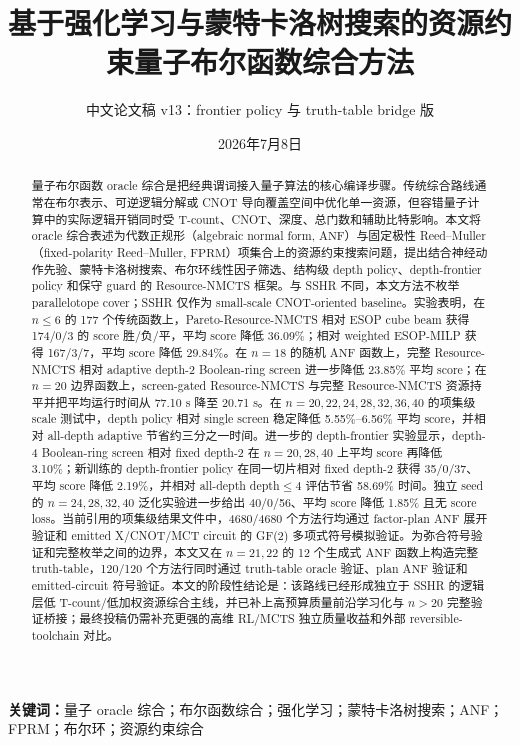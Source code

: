 \documentclass[UTF8,fontset=macnew,11pt]{ctexart}
\title{基于强化学习与蒙特卡洛树搜索的资源约束量子布尔函数综合方法}
\author{中文论文稿 v13：frontier policy 与 truth-table bridge 版}
\date{2026年7月8日}
\newcommand{\method}{Resource-NMCTS}
\newcommand{\screen}{Boolean-ring screen}
\newcommand{\anf}{\ensuremath{\mathrm{ANF}}}
\newcommand{\fprm}{\ensuremath{\mathrm{FPRM}}}
\newcommand{\ttable}{truth-table}
\begin{document}
\pagestyle{plain}
\maketitle

\begin{abstract}
量子布尔函数 oracle 综合是把经典谓词接入量子算法的核心编译步骤。传统综合路线通常在布尔表示、可逆逻辑分解或 CNOT 导向覆盖空间中优化单一资源，但容错量子计算中的实际逻辑开销同时受 T-count、CNOT、深度、总门数和辅助比特影响。本文将 oracle 综合表述为代数正规形（algebraic normal form, \anf{}）与固定极性 Reed--Muller（fixed-polarity Reed--Muller, \fprm{}）项集合上的资源约束搜索问题，提出结合神经动作先验、蒙特卡洛树搜索、布尔环线性因子筛选、结构级 depth policy、depth-frontier policy 和保守 guard 的 \method{} 框架。与 SSHR 不同，本文方法不枚举 parallelotope cover；SSHR 仅作为 small-scale CNOT-oriented baseline。实验表明，在 $n\leq6$ 的 177 个传统函数上，Pareto-\method{} 相对 ESOP cube beam 获得 174/0/3 的 score 胜/负/平，平均 score 降低 36.09\%；相对 weighted ESOP-MILP 获得 167/3/7，平均 score 降低 29.84\%。在 $n=18$ 的随机 \anf{} 函数上，完整 \method{} 相对 adaptive depth-2 \screen{} 进一步降低 23.85\% 平均 score；在 $n=20$ 边界函数上，screen-gated \method{} 与完整 \method{} 资源持平并把平均运行时间从 77.10 s 降至 20.71 s。在 $n=20,22,24,28,32,36,40$ 的项集级 scale 测试中，depth policy 相对 single screen 稳定降低 5.55\%--6.56\% 平均 score，并相对 all-depth adaptive 节省约三分之一时间。进一步的 depth-frontier 实验显示，depth-4 \screen{} 相对 fixed depth-2 在 $n=20,28,40$ 上平均 score 再降低 3.10\%；新训练的 depth-frontier policy 在同一切片相对 fixed depth-2 获得 35/0/37、平均 score 降低 2.19\%，并相对 all-depth depth$\leq4$ 评估节省 58.69\% 时间。独立 seed 的 $n=24,28,32,40$ 泛化实验进一步给出 40/0/56、平均 score 降低 1.85\% 且无 score loss。当前引用的项集级结果文件中，4680/4680 个方法行均通过 factor-plan \anf{} 展开验证和 emitted X/CNOT/MCT circuit 的 GF(2) 多项式符号模拟验证。为弥合符号验证和完整枚举之间的边界，本文又在 $n=21,22$ 的 12 个生成式 \anf{} 函数上构造完整 \ttable{}，120/120 个方法行同时通过 \ttable{} oracle 验证、plan \anf{} 验证和 emitted-circuit 符号验证。本文的阶段性结论是：该路线已经形成独立于 SSHR 的逻辑层低 T-count/低加权资源综合主线，并已补上高预算质量前沿学习化与 $n>20$ 完整验证桥接；最终投稿仍需补充更强的高维 RL/MCTS 独立质量收益和外部 reversible-toolchain 对比。
\end{abstract}

\noindent\textbf{关键词：}量子 oracle 综合；布尔函数综合；强化学习；蒙特卡洛树搜索；ANF；FPRM；布尔环；资源约束综合
\end{document}
